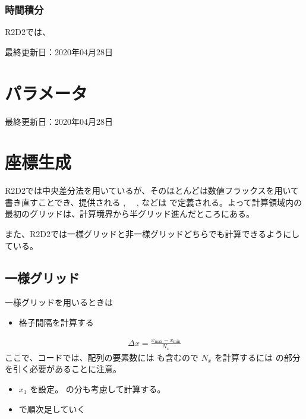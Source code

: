 \documentclass[letterpaper,10pt,dvipdfmx,report]{sphinxmanual}
\begin{document}
\subsection{時間積分}
\label{\detokenize{scheme:id3}}
R2D2では、

最終更新日：2020年04月28日


\chapter{パラメータ}
\label{\detokenize{parameter:id1}}\label{\detokenize{parameter::doc}}
最終更新日：2020年04月28日


\chapter{座標生成}
\label{\detokenize{geometry:id1}}\label{\detokenize{geometry::doc}}
R2D2では中央差分法を用いているが、そのほとんどは数値フラックスを用いて書き直すことでき、提供される  , 　,  などは  で定義される。よって計算領域内の最初のグリッドは、計算境界から半グリッド進んだところにある。

また、R2D2では一様グリッドと非一様グリッドどちらでも計算できるようにしている。


\section{一様グリッド}
\label{\detokenize{geometry:id2}}
一様グリッドを用いるときは
\begin{itemize}
\item {} 
格子間隔を計算する

\end{itemize}
\begin{equation*}
\begin{split}\Delta x = \frac{x_\mathrm{max} - x_\mathrm{min}}{N_x}\end{split}
\end{equation*}
ここで、コードでは、配列の要素数には  も含むので
\(N_x\) を計算するには  の部分を引く必要があることに注意。
\begin{itemize}
\item {} 
\(x_1\) を設定。 の分も考慮して計算する。

\item {} 
 で順次足していく

\end{itemize}
\end{document}
